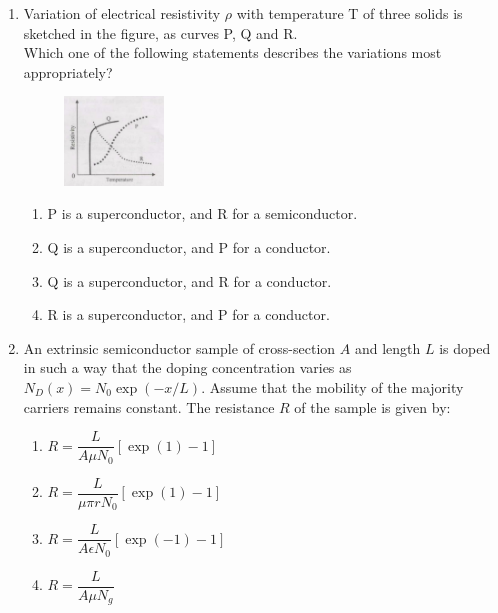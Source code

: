 \documentclass[journal,12pt,onecolumn]{IEEEtran}
\begin{document}
\begin{enumerate}[itemsep = 1em]
\item Variation of electrical resistivity $\rho$ with temperature T of three solids is sketched  in the figure, as curves P, Q and R.\\

Which one of the following statements describes the variations most appropriately?

\hfill{}

\begin{figure}[ht!]
    \centering
    \includegraphics[width=0.25\textwidth]{fig4.jpeg}
    \caption{}
    \label{fig:fig4.jpeg}
\end{figure}

\begin{enumerate}
    \item P is a superconductor, and R for a semiconductor.
    \item Q is a superconductor, and P for a conductor.
    \item Q is a superconductor, and R for a conductor.
    \item R is a superconductor, and P for a conductor.
    
\end{enumerate}

\item An extrinsic semiconductor sample of cross-section $A$ and length $L$ is doped in such a way that the doping concentration varies as $N_D(x) = N_0 \exp(-x/L)$. Assume that the mobility of the majority carriers remains constant. The resistance $R$ of the sample is given by:  

\hfill{}

\begin{multicols}{2}
\begin{enumerate}
    \item $R = \dfrac{L}{A \mu N_0} \left[\exp(1)-1\right]$
    \item $R = \dfrac{L}{\mu \pi r N_0} \left[\exp(1)-1\right]$
    \item $R = \dfrac{L}{A \epsilon N_0} \left[\exp(-1)-1\right]$
    \item $R = \dfrac{L}{A \mu N_g}$
\end{enumerate}
\end{multicols}


\end{enumerate}
\end{document}
